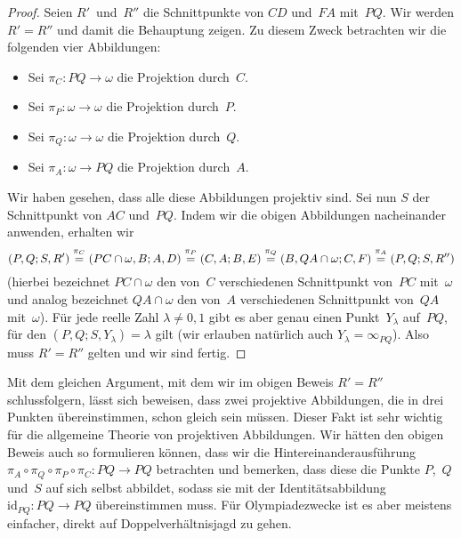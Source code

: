\begin{proof}
	Seien $R'$~und~$R''$ die Schnittpunkte von $CD$ und~$FA$ mit~$PQ$. Wir werden $R'=R''$ und damit die Behauptung zeigen. Zu diesem Zweck betrachten wir die folgenden vier Abbildungen:
	\begin{itemize}
		\item Sei $\pi_C\colon PQ\to \omega$ die Projektion durch~$C$.
		\item Sei $\pi_P\colon \omega\to \omega$ die Projektion durch~$P$.
		\item Sei $\pi_Q\colon \omega\to \omega$ die Projektion durch~$Q$.
		\item Sei $\pi_A\colon \omega\to PQ$ die Projektion durch~$A$.
	\end{itemize}
	Wir haben gesehen, dass alle diese Abbildungen projektiv sind. Sei nun $S$ der Schnittpunkt von $AC$ und~$PQ$. Indem wir die obigen Abbildungen nacheinander anwenden, erhalten wir
	\begin{equation*}
		(P,Q;S,R')\overset{\raisebox{0.5ex}{$\scriptstyle\pi_C$}}{=}(PC\cap\omega,B;A,D)\overset{\raisebox{0.5ex}{$\scriptstyle\pi_P$}}{=}(C,A;B,E)\overset{\raisebox{0.5ex}{$\scriptstyle\pi_Q$}}{=}(B,QA\cap\omega;C,F)\overset{\raisebox{0.5ex}{$\scriptstyle\pi_A$}}{=}(P,Q;S,R'')
	\end{equation*} 
	(hierbei bezeichnet $PC\cap \omega$ den von~$C$ verschiedenen Schnittpunkt von~$PC$ mit~$\omega$ und analog bezeichnet $QA\cap \omega$ den von~$A$ verschiedenen Schnittpunkt von~$QA$ mit~$\omega$). Für jede reelle Zahl $\lambda\neq 0,1$ gibt es aber genau einen Punkt~$Y_\lambda$ auf~$PQ$, für den $(P,Q;S,Y_\lambda)=\lambda$ gilt (wir erlauben natürlich auch $Y_\lambda=\infty_{PQ}$). Also muss $R'=R''$ gelten und wir sind fertig.
\end{proof}

Mit dem gleichen Argument, mit dem wir im obigen Beweis $R'=R''$ schlussfolgern, lässt sich beweisen, dass zwei projektive Abbildungen, die in drei Punkten übereinstimmen, schon gleich sein müssen. Dieser Fakt ist sehr wichtig für die allgemeine Theorie von projektiven Abbildungen. Wir hätten den obigen Beweis auch so formulieren können, dass wir die Hintereinanderausführung $\pi_A\circ\pi_Q\circ\pi_P\circ\pi_C\colon PQ\to PQ$ betrachten und bemerken, dass diese die Punkte $P$,~$Q$ und~$S$ auf sich selbst abbildet, sodass sie mit der Identitätsabbildung $\mathrm{id}_{PQ}\colon PQ\to PQ$ übereinstimmen muss. Für Olympiadezwecke ist es aber meistens einfacher, direkt auf Doppelverhältnisjagd zu gehen. 

